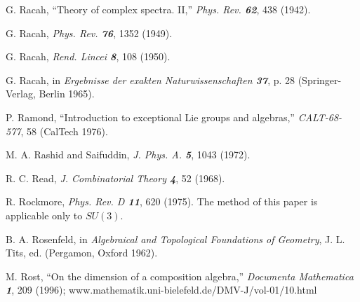 
 G. Racah,
``Theory of complex spectra. II,''
{\em Phys. Rev.   \bf 62}, 438 (1942).

 G. Racah,
{\em Phys. Rev.  \bf 76}, 1352 (1949).

 G. Racah,
{\em Rend. Lincei   \bf 8}, 108 (1950).

 G. Racah, in
{\em Ergebnisse der exakten Naturwissenschaften \bf 37},
 p. 28 (Springer-Verlag, Berlin 1965). %


P. Ramond,
``Introduction to exceptional Lie groups and algebras,''
{\em CALT-68-577}, 58 (CalTech 1976).

M. A. Rashid and Saifuddin,
{\em J. Phys. A.  \bf 5}, 1043 (1972).

R. C. Read,
{\em J. Combinatorial Theory  \bf 4}, 52 (1968).



 R. Rockmore,
    {\em Phys. Rev. D  \bf 11}, 620 (1975).
    The method of this paper is applicable only to $SU(3)$.


 B. A. Rosenfeld,
in {\em Algebraical and Topological Foundations of Geometry},  J. L. Tits, ed.
    (Pergamon, Oxford 1962).

 M. Rost,
    ``On the dimension of a composition algebra,''
    {\em Documenta Mathematica \bf 1}, 209 (1996); %
     {www.mathematik.uni-bielefeld.de/DMV-J/vol-01/10.html}

